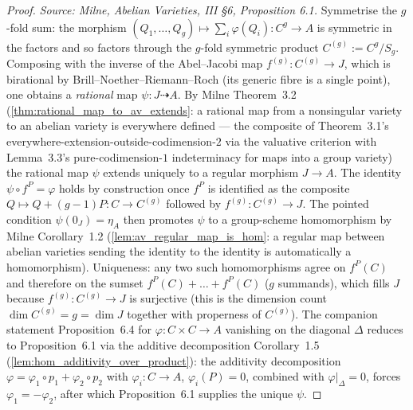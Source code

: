\begin{proof}
  \textit{Source: Milne, Abelian Varieties, III \S 6, Proposition 6.1.}
  Symmetrise the \(g\)-fold sum: the morphism \((Q_1, \dots, Q_g) \mapsto \sum_i \varphi(Q_i) \colon C^g \to A\) is symmetric in the factors and so factors through the \(g\)-fold symmetric product \(C^{(g)} := C^g / S_g\). Composing with the inverse of the Abel--Jacobi map \(f^{(g)} \colon C^{(g)} \to J\), which is birational by Brill--Noether--Riemann--Roch (its generic fibre is a single point), one obtains a \emph{rational} map \(\psi \colon J \dashrightarrow A\). By Milne Theorem~3.2 (\cref{thm:rational_map_to_av_extends}: a rational map from a nonsingular variety to an abelian variety is everywhere defined --- the composite of Theorem~3.1's everywhere-extension-outside-codimension-\(2\) via the valuative criterion with Lemma~3.3's pure-codimension-\(1\) indeterminacy for maps into a group variety) the rational map \(\psi\) extends uniquely to a regular morphism \(J \to A\). The identity \(\psi \circ f^P = \varphi\) holds by construction once \(f^P\) is identified as the composite \(Q \mapsto Q + (g - 1)P \colon C \to C^{(g)}\) followed by \(f^{(g)} \colon C^{(g)} \to J\). The pointed condition \(\psi(0_J) = \eta_A\) then promotes \(\psi\) to a group-scheme homomorphism by Milne Corollary~1.2 (\cref{lem:av_regular_map_is_hom}: a regular map between abelian varieties sending the identity to the identity is automatically a homomorphism). Uniqueness: any two such homomorphisms agree on \(f^P(C)\) and therefore on the sumset \(f^P(C) + \dots + f^P(C)\) (\(g\) summands), which fills \(J\) because \(f^{(g)} \colon C^{(g)} \to J\) is surjective (this is the dimension count \(\dim C^{(g)} = g = \dim J\) together with properness of \(C^{(g)}\)). The companion statement Proposition~6.4 for \(\varphi \colon C \times C \to A\) vanishing on the diagonal \(\Delta\) reduces to Proposition~6.1 via the additive decomposition Corollary~1.5 (\cref{lem:hom_additivity_over_product}): the additivity decomposition \(\varphi = \varphi_1 \circ p_1 + \varphi_2 \circ p_2\) with \(\varphi_i \colon C \to A\), \(\varphi_i(P) = 0\), combined with \(\varphi|_\Delta = 0\), forces \(\varphi_1 = -\varphi_2\), after which Proposition~6.1 supplies the unique \(\psi\).

\end{proof}
